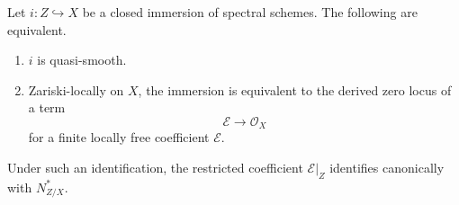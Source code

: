 \begin{theorem}
\label{thm:local-zero-locus-characterization}
Let \(i:Z\hookrightarrow X\) be a closed immersion of spectral schemes. The
following are equivalent.
\begin{enumerate}[label=(\roman*)]
    \item \(i\) is quasi-smooth.
    \item Zariski-locally on \(X\), the immersion is equivalent to the derived
    zero locus of a term
    \[
        \mathcal E\longrightarrow\mathcal O_X
    \]
    for a finite locally free coefficient \(\mathcal E\).
\end{enumerate}
Under such an identification, the restricted coefficient
\(\mathcal E|_Z\) identifies canonically with \(N^*_{Z/X}\).
\end{theorem}

